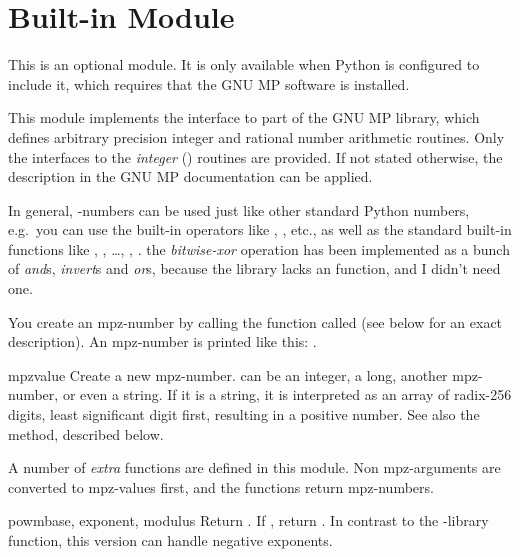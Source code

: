 \section{Built-in Module }
\label{module-mpz}

This is an optional module.  It is only available when Python is
configured to include it, which requires that the GNU MP software is
installed.

This module implements the interface to part of the GNU MP library,
which defines arbitrary precision integer and rational number
arithmetic routines.  Only the interfaces to the \emph{integer}
() routines are provided. If not stated
otherwise, the description in the GNU MP documentation can be applied.

In general, -numbers can be used just like other standard
Python numbers, e.g.\ you can use the built-in operators like \code{+},
\code{*}, etc., as well as the standard built-in functions like
, , \ldots, , .
 the \emph{bitwise-xor} operation has been implemented as
a bunch of \emph{and}s, \emph{invert}s and \emph{or}s, because the library
lacks an  function, and I didn't need one.

You create an mpz-number by calling the function called  (see
below for an exact description). An mpz-number is printed like this:
.

\begin{funcdesc}{mpz}{value}
  Create a new mpz-number.  can be an integer, a long,
  another mpz-number, or even a string. If it is a string, it is
  interpreted as an array of radix-256 digits, least significant digit
  first, resulting in a positive number. See also the 
  method, described below.
\end{funcdesc}

A number of \emph{extra} functions are defined in this module. Non
mpz-arguments are converted to mpz-values first, and the functions
return mpz-numbers.

\begin{funcdesc}{powm}{base, exponent, modulus}
  Return . If
  , return . In contrast to the
  \C-library function, this version can handle negative exponents.
\end{funcdesc}

